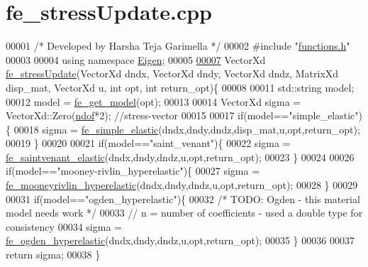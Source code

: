 \hypertarget{fe__stress_update_8cpp_source}{}\section{fe\+\_\+stress\+Update.\+cpp}
\label{fe__stress_update_8cpp_source}

\begin{DoxyCode}
00001 \textcolor{comment}{/* Developed by Harsha Teja Garimella */}
00002 \textcolor{preprocessor}{#include "\hyperlink{functions_8h}{functions.h}"}
00003 
00004 \textcolor{keyword}{using namespace }\hyperlink{namespace_eigen}{Eigen};
00005 
\hyperlink{fe__stress_update_8cpp_a7d0fd8cfef8b891901eb6f0f780fd9f2}{00007} VectorXd \hyperlink{fe__stress_update_8cpp_a7d0fd8cfef8b891901eb6f0f780fd9f2}{fe\_stressUpdate}(VectorXd dndx, VectorXd dndy, VectorXd dndz, MatrixXd disp\_mat, 
      VectorXd u, \textcolor{keywordtype}{int} opt, \textcolor{keywordtype}{int} return\_opt)\{
00008 
00011     std::string model;
00012     model = \hyperlink{functions_8h_a34d6fb85943d945b7e8600d2ef4220d0}{fe\_get\_model}(opt);
00013 
00014     VectorXd sigma = VectorXd::Zero(\hyperlink{_global_variables_8h_aa789fe4d8a13fd0990b630909430d5d0}{ndof}*2); \textcolor{comment}{//stress-vector}
00015 
00017     \textcolor{keywordflow}{if}(model==\textcolor{stringliteral}{"simple\_elastic"})\{
00018         sigma = \hyperlink{functions_8h_ab0911abb05a0ca06eb4f330890ee0641}{fe\_simple\_elastic}(dndx,dndy,dndz,disp\_mat,u,opt,return\_opt);
00019     \}
00020 
00021     \textcolor{keywordflow}{if}(model==\textcolor{stringliteral}{"saint\_venant"})\{
00022         sigma = \hyperlink{functions_8h_af2a970e883d0c4a7ad750547c07c5f24}{fe\_saintvenant\_elastic}(dndx,dndy,dndz,u,opt,return\_opt);
00023     \}
00024 
00026     \textcolor{keywordflow}{if}(model==\textcolor{stringliteral}{"mooney-rivlin\_hyperelastic"})\{
00027         sigma = \hyperlink{functions_8h_a66b469439c736421744f6aef9e05a485}{fe\_mooneyrivlin\_hyperelastic}(dndx,dndy,dndz,u,opt,return\_opt);
00028     \}
00029 
00031     \textcolor{keywordflow}{if}(model==\textcolor{stringliteral}{"ogden\_hyperelastic"})\{
00032         \textcolor{comment}{/* TODO: Ogden - this material model needs work */}
00033         \textcolor{comment}{// n = number of coefficients - used a double type for consistency}
00034         sigma = \hyperlink{functions_8h_ab27ecb703db33cb21a8a6d2fbfbf125f}{fe\_ogden\_hyperelastic}(dndx,dndy,dndz,u,opt,return\_opt);
00035     \}
00036         
00037     \textcolor{keywordflow}{return} sigma;
00038 \}
\end{DoxyCode}
